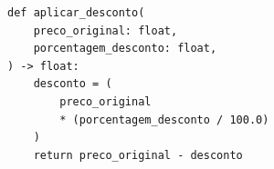 \ifmostrarGabarito
\begin{verbatim}
def aplicar_desconto(
    preco_original: float,
    porcentagem_desconto: float,
) -> float:
    desconto = (
        preco_original
        * (porcentagem_desconto / 100.0)
    )
    return preco_original - desconto
\end{verbatim}

\fi
